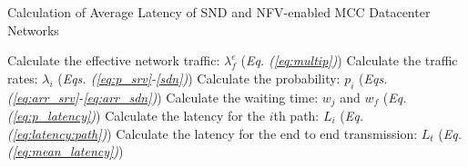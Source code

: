 \begin{algorithm}

\caption{Calculation of Average Latency of SND and NFV-enabled MCC Datacenter Networks}
\label{alg:avg_latency_final}

\begin{algorithmic}[1]
\STATE Calculate the effective network traffic: $\lambda_f^e$ \hfill(\textit{Eq. (\ref{eq:multip})})
\STATE Calculate the traffic rates: $\lambda_i$ \hfill(\textit{Eqs. (\ref{eq:p_srv}-\ref{sdn})})
\STATE Calculate the probability: $p_i$ \hfill(\textit{Eqs. (\ref{eq:arr_srv}-\ref{eq:arr_sdn})})
\STATE Calculate the waiting time: $w_j$ and $w_f$ \hfill(\textit{Eq. (\ref{eq:p_latency})})
\STATE Calculate the latency for the $i$th path: $L_i$ \hfill (\textit{Eq. (\ref{eq:latency:path})})
\STATE Calculate the latency for the end to end transmission: $L_t$ \hfill (\textit{Eq. (\ref{eq:mean_latency})})
\end{algorithmic}
\end{algorithm}